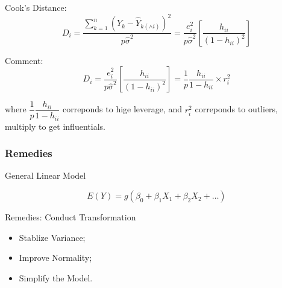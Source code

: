     Cook's Distance: 
    \begin{equation}
        D_i=\dfrac{\sum_{k=1}^n(Y_k-\hat{Y}_{k(\wedge i)})^2}{p\hat{\sigma }^2} =\dfrac{e_i^2}{p\hat{\sigma }^2}\left[ \dfrac{h_{ii}}{(1-h_{ii})^2} \right]
    \end{equation}

    Comment:
    \begin{equation}
        D_i=\dfrac{e_i^2}{p\hat{\sigma }^2}\left[ \dfrac{h_{ii}}{(1-h_{ii})^2} \right]=\dfrac{1}{p}\dfrac{h_{ii}}{1-h_{ii}}\times r_i^2
    \end{equation}

    where $ \dfrac{1}{p}\dfrac{h_{ii}}{1-h_{ii}} $ correponds to hige leverage, and $ r_{i}^2 $ correponds to outliers, multiply to get influentials.
    
    
    
    
    

    
    
    
    
    
    
        










\subsubsection{Remedies}
\begin{point}
    General Linear Model
\end{point}
    
    \begin{equation}
        E(Y)=g(\beta _0+\beta _1X_1+\beta _2X_2+\ldots) 
    \end{equation}
    
\begin{point}
    Remedies: Conduct Transformation
\end{point}

    \begin{itemize}[topsep=2pt,itemsep=2pt]
        \item Stablize Variance;
        \item Improve Normality;
        \item Simplify the Model.
    \end{itemize}

